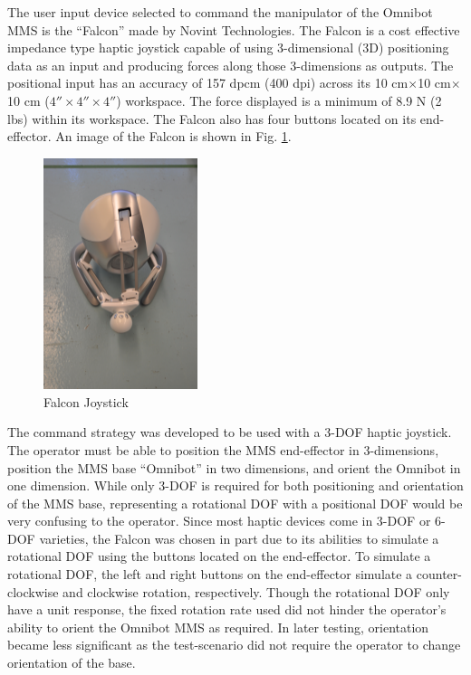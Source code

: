 \documentclass[onecolumn,10pt,final]{asme2ej}
\begin{document}
The user input device selected to command the manipulator of the Omnibot MMS is the ``Falcon'' made by Novint Technologies. The Falcon is a cost effective impedance type haptic joystick capable of using 3-dimensional (3D) positioning data as an input and producing forces along those 3-dimensions as outputs. The positional input has an accuracy of 157 dpcm (400 dpi) across its 10 cm$\times$10 cm$\times$10 cm ($4 ''\times4 ''\times4 ''$) workspace. The force displayed is a minimum of 8.9 N (2 lbs) within its workspace. The Falcon also has four buttons located on its end-effector. An image of the Falcon is shown in Fig. \ref{fig:falcon}.

\begin{figure}[htbp!]
    \centering
    \includegraphics[width=0.4\textwidth, angle = 90]{DSC_0228.jpg}
    \caption{Falcon Joystick}
    \label{fig:falcon}
\end{figure} 

The command strategy was developed to be used with a 3-DOF haptic joystick. The operator must be able to position the MMS end-effector in 3-dimensions, position the MMS base ``Omnibot'' in two dimensions, and orient the Omnibot in one dimension. While only 3-DOF is required for both positioning and orientation of the MMS base, representing a rotational DOF with a positional DOF would be very confusing to the operator. Since most haptic devices come in 3-DOF or 6-DOF varieties, the Falcon was chosen in part due to its abilities to simulate a rotational DOF using the buttons located on the end-effector. To simulate a rotational DOF, the left and right buttons on the end-effector simulate a counter-clockwise and clockwise rotation, respectively. Though the rotational DOF only have a unit response, the fixed rotation rate used did not hinder the operator's ability to orient the Omnibot MMS as required. In later testing, orientation became less significant as the test-scenario did not require the operator to change orientation of the base.\\
\end{document}
